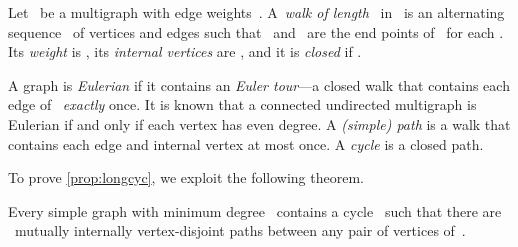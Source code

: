 \documentclass[natbib,sort,smallextended,envcountsame,envcountsect,numbook]{svjour3}
\begin{document}
\begin{definition}
  Let ~be a multigraph with edge weights~.
  A~\emph{walk of length}~ in~
  is an alternating sequence~
  of vertices and edges
  such that
  ~and ~are the end points of~
  for each .
  Its \emph{weight} is , its
  \emph{internal vertices} are , and
  it is \emph{closed} if .

  A graph is \emph{Eulerian} if it contains an \emph{Euler tour}---a closed walk
  that contains each edge of~ \emph{exactly} once.
  It is known that a connected undirected multigraph is Eulerian
  if and only if each vertex has even degree.
  A \emph{(simple) path} is a walk that contains each edge
  and
  internal vertex at most once.
  A \emph{cycle} is a closed path.
\end{definition}


\noindent
To prove \cref{prop:longcyc}, we exploit the following theorem.
\begin{theorem}\label{mader}
  Every simple graph with minimum degree~ contains a cycle~
  such that there are ~mutually internally vertex-disjoint paths
  between any pair of vertices of~.
\end{theorem}

\end{document}
